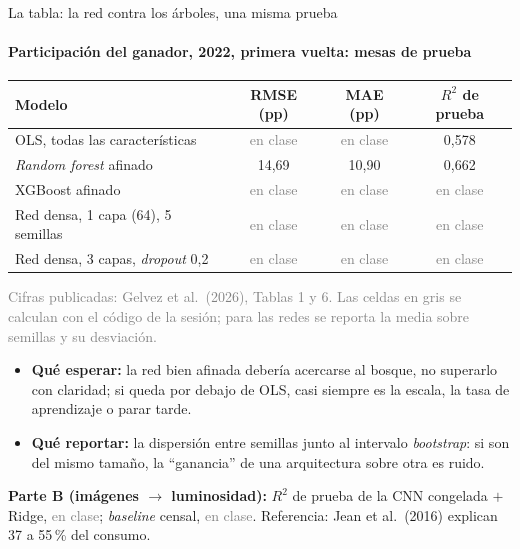\documentclass{beamer}
\newcommand{\1}{\mathbb{I}}
\begin{document}
\begin{frame}{La tabla: la red contra los árboles, una misma prueba}
\framesubtitle{Participación del ganador, 2022, primera vuelta: mesas de prueba}
\small
\begin{center}
\footnotesize
\setlength{\tabcolsep}{5pt}
\begin{tabular}{lccc}
\hline
Modelo & RMSE (pp) & MAE (pp) & $R^2$ de prueba \\
\hline
OLS, todas las características & \textcolor{gray}{en clase} & \textcolor{gray}{en clase} & 0,578 \\
\emph{Random forest} afinado & 14,69 & 10,90 & 0,662 \\
XGBoost afinado & \textcolor{gray}{en clase} & \textcolor{gray}{en clase} & \textcolor{gray}{en clase} \\
Red densa, 1 capa (64), 5 semillas & \textcolor{gray}{en clase} & \textcolor{gray}{en clase} & \textcolor{gray}{en clase} \\
Red densa, 3 capas, \emph{dropout} 0,2 & \textcolor{gray}{en clase} & \textcolor{gray}{en clase} & \textcolor{gray}{en clase} \\
\hline
\end{tabular}
\end{center}
{\scriptsize\textcolor{gray}{Cifras publicadas: Gelvez et al.\ (2026), Tablas 1 y 6. Las celdas en gris se calculan con el código de la sesión; para las redes se reporta la media sobre semillas y su desviación.}}
\pause
\vspace{0.05cm}
\begin{itemize}\itemsep2pt
  \item \textbf{Qué esperar:} la red bien afinada debería acercarse al bosque, no superarlo con claridad; si queda por debajo de OLS, casi siempre es la escala, la tasa de aprendizaje o parar tarde. \pause
  \item \textbf{Qué reportar:} la dispersión entre semillas junto al intervalo \emph{bootstrap}: si son del mismo tamaño, la ``ganancia'' de una arquitectura sobre otra es ruido.
\end{itemize}
\pause
\textbf{Parte B (imágenes $\rightarrow$ luminosidad):} $R^2$ de prueba de la CNN congelada $+$ Ridge, \textcolor{gray}{en clase}; \emph{baseline} censal, \textcolor{gray}{en clase}. Referencia: Jean et al.\ (2016) explican 37 a 55\,\% del consumo.
\end{frame}
\end{document}
